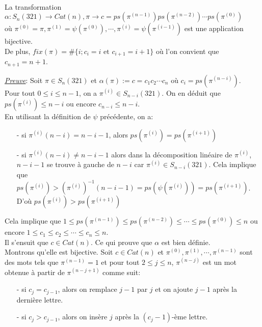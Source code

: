 \begin{proposition} \label{bijCatN} \text{ }\\
	La transformation $\alpha: S_{n}(321)\longrightarrow Cat(n), \pi \longrightarrow c=ps(\pi^{(n-1)})ps(\pi^{(n-2)})\cdots ps(\pi^{(0)}) $\\ où $\pi^{(0)}=\pi, \pi^{(1)}=\psi(\pi^{(0)}), \cdots, \pi^{(i)}=\psi(\pi^{(i-1)})$ est une application bijective.\\
	De plus, $fix(\pi)=\# \{i; c_{i}=i \text{ et }c_{i+1}=i+1\}$ où l'on convient que $c_{n+1}=n+1$.
\end{proposition}
\underline{\textit{Preuve}}:
Soit $\pi\in S_{n}(321)$ et $\alpha(\pi):=c=c_{1}c_{2}\cdots c_{n}$ où $c_{i}=ps(\pi^{(n-i)})$.
\\Pour tout $0\leq i \leq n-1$, on a $\pi^{(i)}\in S_{n-i}(321)$.
On en déduit que $ps(\pi^{(i)})\leq n-i$ ou encore $c_{n-i}\leq n-i$.\\
En utilisant la définition de $\psi$ précédente, on a:
\begin{itemize}
	\item [-] si $\pi^{(i)}(n-i)=n-i-1$, alors $ps(\pi^{(i)})=ps(\pi^{(i+1)})$
	\item [-] si $\pi^{(i)}(n-i)\neq n-i-1$ alors dans la décomposition linéaire de $\pi^{(i)}$, $n-i-1$ se trouve à gauche de $n-i$ car $\pi^{(i)}\in S_{n-i}(321)$. Cela implique que $ps(\pi^{(i)})>(\pi^{(i)})^{-1}(n-i-1) = ps(\psi(\pi^{(i)})) = ps(\pi^{(i+1)})$. D'où $ps(\pi^{(i)}) > ps(\pi^{(i+1)})$
\end{itemize}
Cela implique que $1\leq ps(\pi^{(n-1)}) \leq ps(\pi^{(n-2)}) \leq \cdots \leq ps(\pi^{(0)})\leq n$ ou encore $1\leq c_{1}\leq c_{2}\leq \cdots \leq c_{n}\leq n$.\\
Il s'ensuit que  $c\in Cat(n)$. Ce qui prouve que $\alpha$ est bien définie.\vspace{10pt}\\
Montrons qu'elle est bijective. Soit $c\in Cat(n)$ et $\pi^{(0)}, \pi^{(1)}, \cdots, \pi^{(n-1)}$ sont des mots tels que $\pi^{(n-1)}=1$ et pour tout $2 \leq j \leq n$, $\pi^{(n-j)}$ est un mot obtenue à partir de $\pi^{(n-j+1)}$ comme suit:
\begin{itemize}
	\item [-] si $c_{j}=c_{j-1}$, alors on remplace $j-1$ par $j$ et on ajoute $j-1$ après la dernière lettre.
	\item [-] si $c_{j}>c_{j-1}$, alors on insère $j$ après la $(c_{j}-1)$-ème lettre.
\end{itemize}
